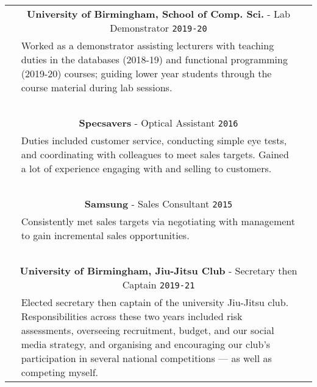 \documentclass[letterpaper,11pt]{article}
\begin{document}
\centering

\def\arraystretch{1.2}

\begin{tabular*}{6.6in}{p{0.1in}p{6.4in}p{0.1in}}

  \multicolumn{3}{c}{\textbf{University of Birmingham, School of Comp. Sci.} - Lab Demonstrator   \cftdotfill{\cftdotsep} \texttt{2019-20}}\\
  \, & {\small Worked as a demonstrator assisting lecturers with teaching duties in the databases (2018-19) and functional programming (2019-20) courses; guiding lower year students through the course material during lab sessions. } & \, \\
  \, & \, & \, \\
  
  \multicolumn{3}{c}{\textbf{Specsavers} - Optical Assistant \cftdotfill{\cftdotsep} \texttt{2016}}\\
  \, & {\small Duties included customer service, conducting simple eye tests, and coordinating with colleagues to meet sales targets. Gained a lot of experience engaging with and selling to customers.} & \, \\
  \, & \, & \, \\

  \multicolumn{3}{c}{\textbf{Samsung} - Sales Consultant \cftdotfill{\cftdotsep} \texttt{2015}}\\
  \, & {\small Consistently met sales targets via negotiating with management to gain incremental sales opportunities. } & \, \\
  \, & \, & \, \\

  \multicolumn{3}{c}{\textbf{University of Birmingham,  Jiu-Jitsu Club} - Secretary then Captain \cftdotfill{\cftdotsep} \texttt{2019-21}}\\
  \, & {\small Elected secretary then captain of the university Jiu-Jitsu club. Responsibilities across these two years included risk assessments, overseeing recruitment, budget, and our social media strategy, and organising and encouraging our club's participation in several national competitions --- as well as competing myself. } & \,


\end{tabular*}                                                                                                                                                                                                                                                                                          
\end{document}
